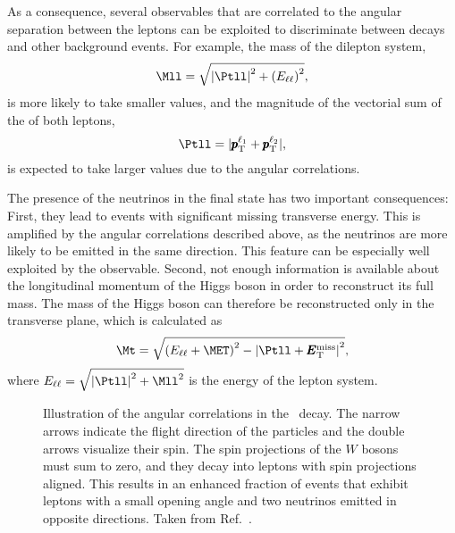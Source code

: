 As a consequence, several observables that are correlated to the angular separation between the leptons can be exploited to discriminate between \HWWdet decays and other background events. For example, the mass of the dilepton system,
\begin{equation}
    \Mll = \sqrt{\left| \Ptll \right|^2+ \left( E_{\ell\ell} \right)^2},
\end{equation}
is more likely to take smaller values, and the magnitude of the vectorial sum of the \pT of both leptons,
\begin{equation}
    \Ptll = |\pmb{p}_\text{T}^{\ell_1} + \pmb{p}_\text{T}^{\ell_2}|,
\end{equation}
is expected to take larger values due to the angular correlations.

The presence of the neutrinos in the final state has two important consequences:
First, they lead to events with significant missing transverse energy. This is amplified by the angular correlations described above, as the neutrinos are more likely to be emitted in the same direction. This feature can be especially well exploited by the \METSig observable.
Second, not enough information is available about the longitudinal momentum of the Higgs boson in order to reconstruct its full mass. The mass of the Higgs boson can therefore be reconstructed only in the transverse plane, which is calculated as
\begin{equation}
  \Mt = \sqrt{ \left( E_{\ell\ell}+\MET \right)^2 - \left| \Ptll + \pmb{E}_{\text{T}}^{\text{miss}} \right|^2 },
\end{equation}
where $E_{\ell\ell} = \sqrt{ \left|\Ptll\right|^2 + \Mll^2}$ is the energy of the lepton system.
\begin{figure}
    \caption[Angular correlations in the \HWWdet\ decay.]{Illustration of the angular correlations in the \HWWdet\ decay. The narrow arrows indicate the flight direction of the particles and the double arrows visualize their spin. The spin projections of the $W$ bosons must sum to zero, and they decay into leptons with spin projections aligned. This results in an enhanced fraction of events that exhibit leptons with a small opening angle and two neutrinos emitted in opposite directions. Taken from Ref.~\cite{HIGG-2013-13}.}
    \label{fig:spin-correlations}
\end{figure}

